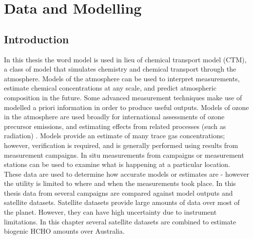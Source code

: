 
\chapter{Data and Modelling} %
\label{Model} %
  
\section{Introduction}
  
  In this thesis the word model is used in lieu of chemical transport model (CTM), a class of model that simulates chemistry and chemical transport through the atmosphere.
  Models of the atmosphere can be used to interpret measurements, estimate chemical concentrations at any scale, and predict atmospheric composition in the future.
  Some advanced measurement techniques make use of modelled a priori information in order to produce useful outputs.
  Models of ozone in the atmosphere are used broadly for international assessments of ozone precursor emissions, and estimating effects from related processes (such as radiation) \parencite{Young2018}.
  Models provide an estimate of many trace gas concentrations; however, verification is required, and is generally performed using results from measurement campaigns.
  In situ measurements from campaigns or measurement stations can be used to examine what is happening at a particular location.
  These data are used to determine how accurate models or estimates are - however the utility is limited to where and when the measurements took place.
  In this thesis data from several campaigns are compared against model outputs and satellite datasets.
  Satellite datasets provide large amounts of data over most of the planet.
  However, they can have high uncertainty due to instrument limitations.
  In this chapter several satellite datasets are combined to estimate biogenic HCHO amounts over Australia.
  
